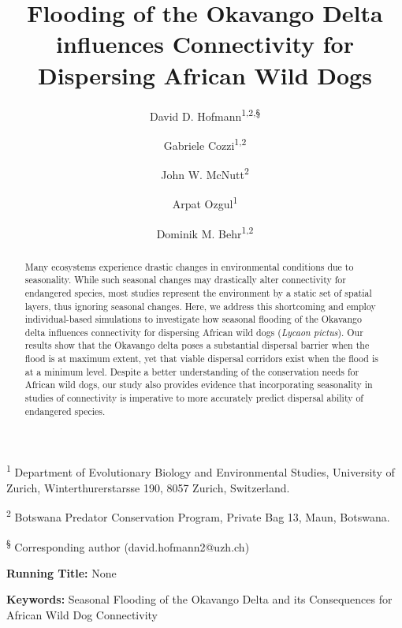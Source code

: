 \documentclass[abstract=on,10pt,a4paper,bibliography=totocnumbered]{article}
\title{Flooding of the Okavango Delta influences Connectivity for Dispersing
African Wild Dogs}
\author{
  David D. Hofmann\textsuperscript{1,2,\S} \orcid{0000-0003-3477-4365} \and
  Gabriele Cozzi\textsuperscript{1,2} \orcid{0000-0002-1744-1940} \and
  John W. McNutt\textsuperscript{2} \and
  Arpat Ozgul\textsuperscript{1} \orcid{0000-0001-7477-2642} \and
  Dominik M. Behr\textsuperscript{1,2} \orcid{0000-0001-7378-8538}
}
\begin{document}



\maketitle

\begin{flushleft}

\vspace{0.5cm}

\textsuperscript{1} Department of Evolutionary Biology and Environmental
Studies, University of Zurich, Winterthurerstarsse 190, 8057 Zurich,
Switzerland.

\textsuperscript{2} Botswana Predator Conservation Program, Private Bag 13,
Maun, Botswana.

\textsuperscript{\S} Corresponding author (david.hofmann2@uzh.ch)

\vspace{4cm}

\textbf{Running Title:} None

\vspace{0.5cm}

\textbf{Keywords:} Seasonal Flooding of the Okavango Delta and its Consequences
for African Wild Dog Connectivity

\end{flushleft}

\newpage
\begin{abstract}
Many ecosystems experience drastic changes in environmental conditions due to
seasonality. While such seasonal changes may drastically alter connectivity for
endangered species, most studies represent the environment by a static set of
spatial layers, thus ignoring seasonal changes. Here, we address this
shortcoming and employ individual-based simulations to investigate how seasonal
flooding of the Okavango delta influences connectivity for dispersing African
wild dogs (\textit{Lycaon pictus}). Our results show that the Okavango delta
poses a substantial dispersal barrier when the flood is at maximum extent, yet
that viable dispersal corridors exist when the flood is at a minimum level.
Despite a better understanding of the conservation needs for African wild dogs,
our study also provides evidence that incorporating seasonality in studies of
connectivity is imperative to more accurately predict dispersal ability of
endangered species.
\end{abstract}
\end{document}
